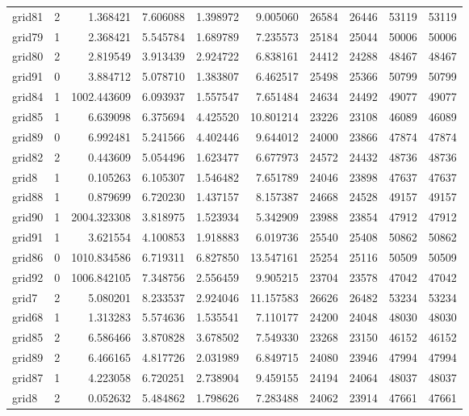 \begin{longtable}{|l|r|r|r|r|r|r|r|r|r|}
grid81 & 2 & 1.368421 & 7.606088 & 1.398972 & 9.005060 & 26584 & 26446 & 53119 & 53119 \\
grid79 & 1 & 2.368421 & 5.545784 & 1.689789 & 7.235573 & 25184 & 25044 & 50006 & 50006 \\
grid80 & 2 & 2.819549 & 3.913439 & 2.924722 & 6.838161 & 24412 & 24288 & 48467 & 48467 \\
grid91 & 0 & 3.884712 & 5.078710 & 1.383807 & 6.462517 & 25498 & 25366 & 50799 & 50799 \\
grid84 & 1 & 1002.443609 & 6.093937 & 1.557547 & 7.651484 & 24634 & 24492 & 49077 & 49077 \\
grid85 & 1 & 6.639098 & 6.375694 & 4.425520 & 10.801214 & 23226 & 23108 & 46089 & 46089 \\
grid89 & 0 & 6.992481 & 5.241566 & 4.402446 & 9.644012 & 24000 & 23866 & 47874 & 47874 \\
grid82 & 2 & 0.443609 & 5.054496 & 1.623477 & 6.677973 & 24572 & 24432 & 48736 & 48736 \\
grid8 & 1 & 0.105263 & 6.105307 & 1.546482 & 7.651789 & 24046 & 23898 & 47637 & 47637 \\
grid88 & 1 & 0.879699 & 6.720230 & 1.437157 & 8.157387 & 24668 & 24528 & 49157 & 49157 \\
grid90 & 1 & 2004.323308 & 3.818975 & 1.523934 & 5.342909 & 23988 & 23854 & 47912 & 47912 \\
grid91 & 1 & 3.621554 & 4.100853 & 1.918883 & 6.019736 & 25540 & 25408 & 50862 & 50862 \\
grid86 & 0 & 1010.834586 & 6.719311 & 6.827850 & 13.547161 & 25254 & 25116 & 50509 & 50509 \\
grid92 & 0 & 1006.842105 & 7.348756 & 2.556459 & 9.905215 & 23704 & 23578 & 47042 & 47042 \\
grid7 & 2 & 5.080201 & 8.233537 & 2.924046 & 11.157583 & 26626 & 26482 & 53234 & 53234 \\
grid68 & 1 & 1.313283 & 5.574636 & 1.535541 & 7.110177 & 24200 & 24048 & 48030 & 48030 \\
grid85 & 2 & 6.586466 & 3.870828 & 3.678502 & 7.549330 & 23268 & 23150 & 46152 & 46152 \\
grid89 & 2 & 6.466165 & 4.817726 & 2.031989 & 6.849715 & 24080 & 23946 & 47994 & 47994 \\
grid87 & 1 & 4.223058 & 6.720251 & 2.738904 & 9.459155 & 24194 & 24064 & 48037 & 48037 \\
grid8 & 2 & 0.052632 & 5.484862 & 1.798626 & 7.283488 & 24062 & 23914 & 47661 & 47661 \\

\end{longtable}
